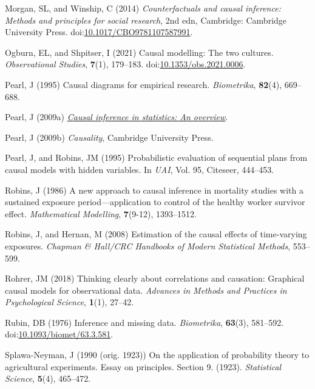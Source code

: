 \documentclass[
  singlecolumn]{article}
\newlength{\cslhangindent}
\newenvironment{CSLReferences}[2] %
 {\begin{list}{}{%
  \setlength{\itemindent}{0pt}
  \setlength{\leftmargin}{0pt}
  \setlength{\parsep}{0pt}
  \ifodd #1
   \setlength{\leftmargin}{\cslhangindent}
   \setlength{\itemindent}{-1\cslhangindent}
  \fi
  \setlength{\itemsep}{#2\baselineskip}}}
 {\end{list}}
\begin{document}
\begin{CSLReferences}{1}{0}
Morgan, SL, and Winship, C (2014) \emph{Counterfactuals and causal
inference: Methods and principles for social research}, 2nd edn,
Cambridge: Cambridge University Press.
doi:\href{https://doi.org/10.1017/CBO9781107587991}{10.1017/CBO9781107587991}.

Ogburn, EL, and Shpitser, I (2021) Causal modelling: The two cultures.
\emph{Observational Studies}, \textbf{7}(1), 179--183.
doi:\href{https://doi.org/10.1353/obs.2021.0006}{10.1353/obs.2021.0006}.

Pearl, J (1995) Causal diagrams for empirical research.
\emph{Biometrika}, \textbf{82}(4), 669--688.

Pearl, J (2009a) \emph{\href{https://doi.org/10.1214/09-SS057}{Causal
inference in statistics: An overview}}.

Pearl, J (2009b) \emph{Causality}, Cambridge University Press.

Pearl, J, and Robins, JM (1995) Probabilistic evaluation of sequential
plans from causal models with hidden variables. In \emph{UAI}, Vol. 95,
Citeseer, 444--453.

Robins, J (1986) A new approach to causal inference in mortality studies
with a sustained exposure period---application to control of the healthy
worker survivor effect. \emph{Mathematical Modelling}, \textbf{7}(9-12),
1393--1512.

Robins, J, and Hernan, M (2008) Estimation of the causal effects of
time-varying exposures. \emph{Chapman \& Hall/CRC Handbooks of Modern
Statistical Methods}, 553--599.

Rohrer, JM (2018) Thinking clearly about correlations and causation:
Graphical causal models for observational data. \emph{Advances in
Methods and Practices in Psychological Science}, \textbf{1}(1), 27--42.

Rubin, DB (1976) Inference and missing data. \emph{Biometrika},
\textbf{63}(3), 581--592.
doi:\href{https://doi.org/10.1093/biomet/63.3.581}{10.1093/biomet/63.3.581}.

Splawa-Neyman, J (1990 (orig. 1923)) On the application of probability
theory to agricultural experiments. Essay on principles. Section 9.
(1923). \emph{Statistical Science}, \textbf{5}(4), 465--472.


\end{CSLReferences}
\end{document}

